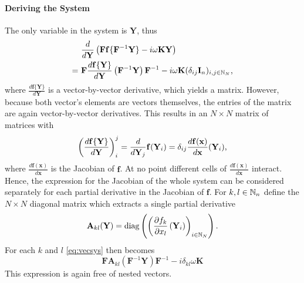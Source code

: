 \paragraph{Deriving the System} %
The only variable in the system is $\mathbf Y$, thus
	\begin{align}
		& \frac{d}{d\mathbf Y} \left( \mathbf{F} \mathbf{f}\{\mathbf{F}^{-1} \mathbf{Y}\} - i \omega \mathbf K \mathbf Y \right) \nonumber \\
		=\ & \mathbf{F} \frac{d \mathbf{f}\{\mathbf Y\}}{d\mathbf Y} \left( \mathbf{F}^{-1} \mathbf{Y} \right) \mathbf{F}^{-1} - i \omega \mathbf K (\delta_{ij} \mathbf I_n)_{i,j \in \mathbb{N}_N} \label{eq:vecsys} \text,
	\end{align}
where $\frac{d \mathbf{f} \{ \mathbf Y \}}{d \mathbf Y}$ is a vector-by-vector derivative, which yields a matrix.
However, because both vector's elements are vectors themselves, the entries of the matrix are again vector-by-vector derivatives.
This results in an $N \times N$ matrix of matrices with
	\[
			\left( \frac{d \mathbf{f}\{\mathbf Y\}}{d\mathbf Y} \right)_i^j = \frac{d}{d\mathbf Y_j} \mathbf f (\mathbf Y_i) = \delta_{ij} \frac{d \mathbf f(\mathbf x)}{d \mathbf x}(\mathbf Y_i) \text, %
	\]
where $\frac{d \mathbf f(\mathbf x)}{d\mathbf x}$ is the Jacobian of $\mathbf f$.
At no point different cells of $\frac{d \mathbf f(\mathbf x)}{d\mathbf x}$ interact.
Hence, the expression for the Jacobian of the whole system can be considered separately for each partial derivative in the Jacobian of $\mathbf f$.
For $k,l \in \mathbb{N}_n$ define the $N \times N$ diagonal matrix which extracts a single partial derivative
	\[
		\mathbf A_{kl}(\mathbf Y) = \operatorname{diag}\left( \left(\frac{\partial f_k}{\partial x_l} \left(\mathbf Y_i\right)\right)_{i \in \mathbb{N}_N} \right) \text.
	\]
For each $k$ and $l$ \autoref{eq:vecsys} then becomes
	\begin{equation}
		\mathbf{F} \mathbf A_{kl}(\mathbf{F}^{-1} \mathbf{Y}) \mathbf{F}^{-1} - i \delta_{kl} \omega \mathbf K
	\label{eq:syssingle}
	\end{equation}
This expression is again free of nested vectors.

